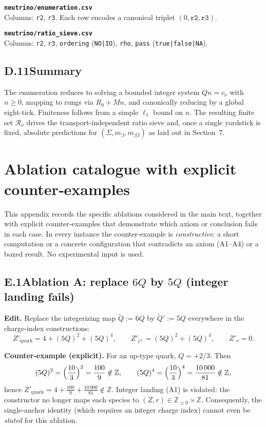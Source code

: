 \documentclass[11pt]{article}
\begin{document}
\medskip
\noindent\textbf{\texttt{neutrino/enumeration.csv}}\\
Columns: \texttt{r2}, \texttt{r3}. Each row encodes a canonical triplet $(0,\texttt{r2},\texttt{r3})$.

\medskip
\noindent\textbf{\texttt{neutrino/ratio\_sieve.csv}}\\
Columns: \texttt{r2}, \texttt{r3}, \texttt{ordering} (\texttt{NO|IO}), \texttt{rho}, \texttt{pass} (\texttt{true|false|NA}).

\subsection*{D.11\quad Summary}

The enumeration reduces to solving a bounded integer system $Qn=c_\nu$ with $n\ge 0$, mapping to rungs via $R_0+Mn$, and canonically reducing by a global eight-tick. Finiteness follows from a simple $\ell_1$ bound on $n$. The resulting finite set $\mathcal{R}_\nu$ drives the transport-independent ratio sieve and, once a single yardstick is fixed, absolute predictions for $(\Sigma, m_\beta, m_{\beta\beta})$ as laid out in Section~7.

\section{Ablation catalogue with explicit counter‑examples}

This appendix records the specific ablations considered in the main text, together with explicit counter‑examples that demonstrate which axiom or conclusion fails in each case. In every instance the counter‑example is \emph{constructive}: a short computation or a concrete configuration that contradicts an axiom (A1–A4) or a boxed result. No experimental input is used.

\subsection*{E.1\quad Ablation A: replace $6Q$ by $5Q$ (integer landing fails)}

\textbf{Edit.} Replace the integerizing map $\tilde Q:=6Q$ by $\tilde Q':=5Q$ everywhere in the charge-index constructions:
\[
Z'_{\text{quark}}=4+(5Q)^2+(5Q)^4,\qquad Z'_{\ell^\pm}=(5Q)^2+(5Q)^4,\qquad Z'_{\nu}=0.
\]

\textbf{Counter‑example (explicit).}
For an up‑type quark, $Q=+2/3$. Then
\[
(5Q)^2=\Bigl(\frac{10}{3}\Bigr)^2=\frac{100}{9}\notin\mathbb{Z},
\qquad
(5Q)^4=\Bigl(\frac{10}{3}\Bigr)^4=\frac{10\,000}{81}\notin\mathbb{Z},
\]
hence $Z'_{\text{quark}}=4+\frac{100}{9}+\frac{10\,000}{81}\notin\mathbb{Z}$. Integer landing (A1) is violated: the constructor no longer maps each species to $(Z,r)\in\mathbb{Z}_{\ge 0}\times\mathbb{Z}$. Consequently, the single‑anchor identity (which requires an integer charge index) cannot even be \emph{stated} for this ablation.
\end{document}
